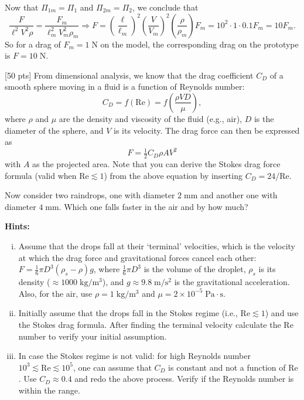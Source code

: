 \documentclass[12pt]{article}
\begin{document}
\begin{ex}
\begin{solution}
  Now that $\Pi_{1m}=\Pi_{1}$ and $\Pi_{2m}=\Pi_2$, we conclude that
  \begin{equation*}
    \frac{F}{\ell^2V^2\rho}=\frac{F_m}{\ell_m^2V_m^2\rho_m}\Rightarrow F=\left(\frac{\ell}{\ell_m}\right)^2\left(\frac{V}{V_m}\right)^2\left(\frac{\rho}{\rho_m}\right)F_m=10^2\cdot 1\cdot 0.1F_m=10F_m.
  \end{equation*}
  So for a drag of $F_m=1\;\mathrm{N}$ on the model, the corresponding drag on the prototype is $F=10\;\mathrm{N}$.
\end{solution}
\end{ex}

\begin{ex}

  [50 pts] From dimensional analysis, we know that the drag coefficient $C_D$ of a smooth sphere moving in a fluid is a function of Reynolds number:
  \begin{equation*}
    C_D=f(\mathrm{Re})=f\left(\frac{\rho V D}{\mu}\right),
  \end{equation*}
  where $\rho$ and $\mu$ are the density and viscosity of the fluid (e.g., air), $D$ is the diameter of the sphere, and $V$ is its velocity. The drag force can then be expressed as
  \begin{equation*}
    F=\tfrac{1}{2}C_D\rho A V^2
  \end{equation*}
  with $A$ as the projected area. Note that you can derive the Stokes drag force formula (valid when $\mathrm{Re}\lesssim 1$) from the above equation by inserting $C_D=24/\mathrm{Re}$.

  Now consider two raindrops, one with diameter $2\;\mathrm{mm}$ and another one with diameter $4\;\mathrm{mm}$. Which one falls faster in the air and by how much?

\vspace{0.5cm}\noindent\textbf{Hints:}
\begin{enumerate}[(i)]
\item Assume that the drops fall at their `terminal' velocities, which is the velocity at which the drag force and gravitational forces cancel each other: $F=\tfrac{1}{6}\pi D^3(\rho_s-\rho)g$, where $\tfrac{1}{6}\pi D^3$ is the volume of the droplet, $\rho_s$ is its density ($\approx 1000\;\mathrm{kg/m^3}$), and $g\approx 9.8\;\mathrm{m/s^2}$ is the gravitational acceleration. Also, for the air, use $\rho=1\;\mathrm{kg/m^3}$ and $\mu=2\times 10^{-5}\;\mathrm{Pa\cdot s}$.
\item Initially assume that the drops fall in the Stokes regime (i.e., $\mathrm{Re}\lesssim 1$) and use the Stokes drag formula. After finding the terminal velocity calculate the $\mathrm{Re}$ number to verify your initial assumption.
\item In case the Stokes regime is not valid: for high Reynolds number $10^3\lesssim\mathrm{Re}\lesssim10^5$, one can assume that $C_D$ is constant and not a function of $\mathrm{Re}$. Use $C_D\approx 0.4$ and redo the above process. Verify if the Reynolds number is within the range.
\end{enumerate}


\end{ex}
\end{document}
